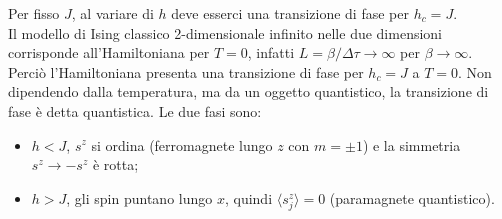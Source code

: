 \documentclass[10pt,a4paper]{report}
\theoremstyle{definition}
\numberwithin{equation}{section}
\newcommand{\bra}{\langle}
\newcommand{\ket}{\rangle}
\begin{document}
Per fisso $J$, al variare di $h$ deve esserci una transizione di fase per $h_c=J$. \\
Il modello di Ising classico 2-dimensionale infinito nelle due dimensioni corrisponde all'Hamiltoniana per $T=0$, infatti $L=\beta/\Delta\tau\to\infty$ per $\beta\to\infty$. Perciò l'Hamiltoniana presenta una transizione di fase per $h_c=J$ a $T=0$. Non dipendendo dalla temperatura, ma da un oggetto quantistico, la transizione di fase è detta quantistica. Le due fasi sono:
\begin{itemize}
\item $h<J$, $s^z$ si ordina (ferromagnete lungo $z$ con $m=\pm 1$) e la simmetria $s^z\to -s^z$ è rotta;
\item $h>J$, gli spin puntano lungo $x$, quindi $\bra s_j^z\ket=0$ (paramagnete quantistico).
\end{itemize}
\end{document}

